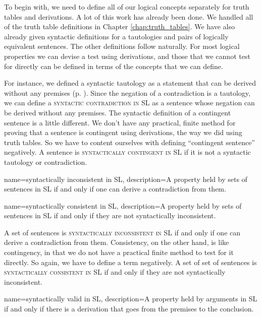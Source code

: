 To begin with, we need to define all of our logical concepts separately for truth tables and derivations. A lot of this work has already been done. We handled all of the truth table definitions in Chapter \ref{chap:truth_tables}. We have also already given syntactic definitions for a tautologies and pairs of logically equivalent sentences. The other definitions follow naturally. For most logical properties we can devise a test using derivations, and those that we cannot test for directly can be defined in terms of the concepts that we can define.

For instance, we defined a syntactic tautology as a statement that can be derived without any premises (p. \pageref{def:syntactic_tautology_in_sl}). Since the negation of a contradiction is a tautology, we can define a \textsc{\gls{syntactic contradiction in SL}} \label{def:syntactic_contradiction_in_sl} as a sentence whose negation can be derived without any premises. The syntactic definition of a contingent sentence is a little different. We don't have any practical, finite method for proving that a sentence is contingent using derivations, the way we did using truth tables. So we have to content ourselves with defining ``contingent sentence'' negatively. A sentence is \textsc{\gls{syntactically contingent in SL}} \label{def:syntactically_contingent_in_sl} if it is not a syntactic tautology or contradiction. 
 
{
name=syntactically inconsistent in SL,
description={A property held by sets of sentences in SL if and only if one can derive a contradiction from them.}
}

{
name=syntactically consistent in SL,
description={A property held by sets of sentences in SL if and only if they are not syntactically inconsistent.}
}

A set of sentences is \textsc{\gls{syntactically inconsistent in SL}} \label{def:syntactically_inconsistent_ in_sl} if and only if one can derive a contradiction from them. Consistency, on the other hand, is like contingency, in that we do not have a practical finite method to test for it directly. So again, we have to define a term negatively. A set of set of sentences is \textsc{\gls{syntactically consistent in SL}} \label{def:syntactically consistent in SL} if and only if they are not syntactically inconsistent.
    
{
name=syntactically valid in SL,
description={A property held by arguments in SL if and only if there is a derivation that goes from the premises to the conclusion.}
}

